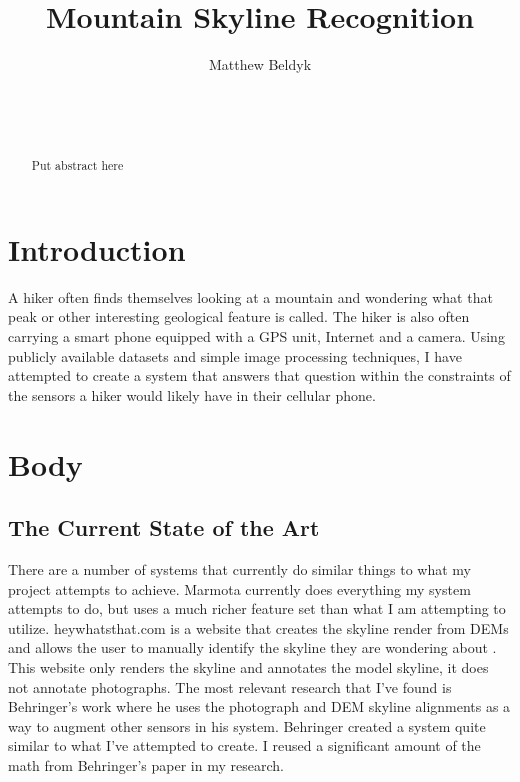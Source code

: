 \documentclass{acm_proc_article-sp}
\begin{document}
\title{Mountain Skyline Recognition}



%
\author{
\alignauthor
Matthew Beldyk\\
       \\
       \\
       \\
}

\maketitle
\begin{abstract}
Put abstract here
\end{abstract}

\section{Introduction}
A hiker often finds themselves looking at a mountain and wondering what that peak or other interesting geological feature is called.  The hiker is also often carrying a smart phone equipped with a GPS unit, Internet and a camera.  Using publicly available datasets and simple image processing techniques, I have attempted to create a system that answers that question within the constraints of the sensors a hiker would likely have in their cellular phone.  
\section{Body}
\subsection{The Current State of the Art}
There are a number of systems that currently do similar things to what my project attempts to achieve.  Marmota currently does everything my system attempts to do, but uses a much richer feature set than what I am attempting to utilize.\cite{chippendale2009environmental, chippendale2009spatial}  heywhatsthat.com is a website that creates the skyline render from DEMs and allows the user to manually identify the skyline they are wondering about \cite{wong2008we, heywhatsthat}.  This website only renders the skyline and annotates the model skyline, it does not annotate photographs.  The most relevant research that I’ve found is Behringer’s work \cite{behringer2002registration} where he uses the photograph and DEM skyline alignments as a way to augment other sensors in his system.  Behringer created a system quite similar to what I’ve attempted to create. I reused a significant amount of the math from Behringer’s paper in my research.
\end{document}
